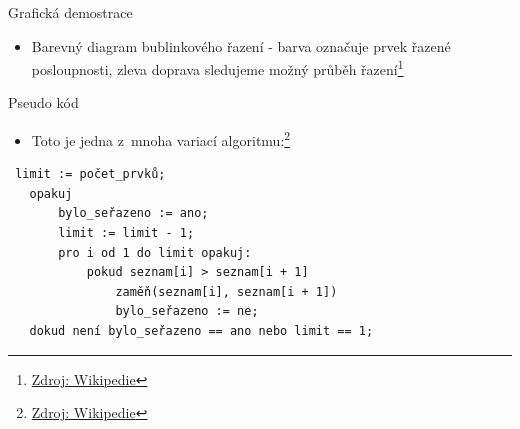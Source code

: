 \documentclass[11pt]{beamer}
\begin{document}
\begin{frame}[fragile]{Grafická demostrace}

\begin{figure}[]
        \centering
    \end{figure}
\begin{itemize}
    \item Barevný diagram bublinkového řazení - barva označuje prvek řazené posloupnosti, zleva doprava sledujeme možný průběh řazení\footnote{\tiny\href{https://en.wikipedia.org/wiki/Bubble_sort}{Zdroj: Wikipedie}}
\end{itemize}
\end{frame}

\begin{frame}[fragile]{Pseudo kód}
\begin{itemize}
    \item Toto je jedna z~mnoha variací algoritmu:\footnote{\tiny\href{https://tiny.cc/dt6i7y}{Zdroj: Wikipedie}}
\end{itemize}
\begin{verbatim}
 limit := počet_prvků;
   opakuj
       bylo_seřazeno := ano;
       limit := limit - 1;
       pro i od 1 do limit opakuj:
           pokud seznam[i] > seznam[i + 1]
               zaměň(seznam[i], seznam[i + 1])
               bylo_seřazeno := ne;
   dokud není bylo_seřazeno == ano nebo limit == 1;
\end{verbatim}

\end{frame}
\end{document}
